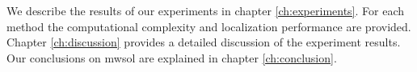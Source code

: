 We describe the results of our experiments in chapter \ref{ch:experiments}. For each method the computational complexity and localization performance are provided. Chapter \ref{ch:discussion} provides a detailed discussion of the experiment results. Our conclusions on \acrshort{mwsol} are explained in chapter \ref{ch:conclusion}.